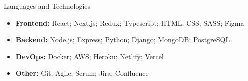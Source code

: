 \documentclass[]{mcdowellcv}
\begin{document}
	\begin{cvsection}{Languages and Technologies}
		\begin{cvsubsection}{}{}{}	
			\begin{itemize}
				\item \textbf{Frontend:} React; Next.js; Redux; Typescript; HTML; CSS; SASS; Figma
				\item \textbf{Backend:} Node.js; Express; Python; Django; MongoDB; PostgreSQL
				\item \textbf{DevOps:} Docker; AWS; Heroku; Netlify; Vercel
				\item \textbf{Other:} Git; Agile; Scrum; Jira; Confluence
			\end{itemize}
		\end{cvsubsection}
	\end{cvsection}
	
\end{document}
